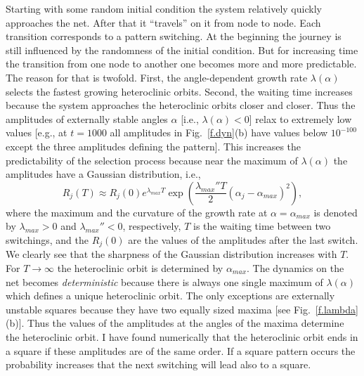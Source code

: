 Starting with some random initial condition the system relatively
quickly approaches the net. After that it ``travels'' on it from node
to node. Each transition corresponds to a pattern switching. At the
beginning the journey is still influenced by the randomness of the
initial condition. But for increasing time the transition from one
node to another one becomes more and more predictable. The reason for
that is twofold.  First, the angle-dependent growth rate
$\lambda(\alpha)$ selects the fastest growing heteroclinic orbits.
Second, the waiting time increases because the system approaches the
heteroclinic orbits closer and closer.  Thus the amplitudes of
externally stable angles $\alpha$ [i.e., $\lambda(\alpha)<0$] relax
to extremely low values [e.g., at $t=1000$ all amplitudes in
Fig.~\ref{f.dyn}(b) have values below $10^{-100}$ except the three
amplitudes defining the pattern]. This increases the predictability
of the selection process because near the maximum of 
$\lambda(\alpha)$ the amplitudes have a Gaussian distribution, i.e.,
\begin{equation}
  R_j(T)\approx R_j(0)e^{\lambda_{max}T}\exp\left(\frac{
   \lambda_{max}''T}{2}(\alpha_j-\alpha_{max})^2\right),
  \label{r.dist}
\end{equation}
where the maximum and the curvature of the growth rate at
$\alpha=\alpha_{max}$ is denoted by $\lambda_{max}>0$ and
$\lambda_{max}''<0$, respectively, $T$ is the waiting time between
two switchings, and the $R_j(0)$ are the values of the amplitudes
after the last switch. We clearly see that the sharpness of the
Gaussian distribution increases with $T$. For $T\to\infty$ the
heteroclinic orbit is determined by $\alpha_{max}$. The dynamics on
the net becomes {\em deterministic\/} because there is always one
single maximum of $\lambda(\alpha)$ which defines a unique
heteroclinic orbit. The only exceptions are externally unstable
squares because they have two equally sized maxima [see
Fig.~\ref{f.lambda}(b)]. Thus the values of the amplitudes at the
angles of the maxima determine the heteroclinic orbit. I have found
numerically that the heteroclinic orbit ends in a square if these
amplitudes are of the same order. If a square pattern occurs the
probability increases that the next switching will lead also to a
square. 

